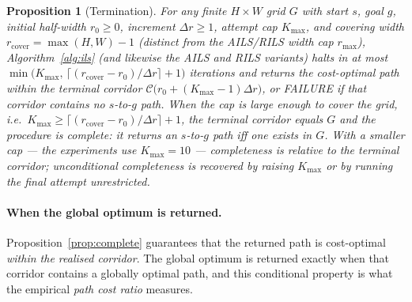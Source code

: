 \documentclass[preprint,12pt,authoryear]{elsarticle}
\newtheorem{proposition}{Proposition}
\begin{document}
\begin{proposition}[Termination]\label{prop:termination}
For any finite $H \times W$ grid $G$ with start $s$, goal $g$, initial half-width $r_0 \geq 0$, increment $\Delta r \geq 1$, attempt cap $K_{\max}$, and covering width $r_{\mathrm{cover}} = \max(H, W) - 1$ (distinct from the AILS/RILS width cap $r_{\max}$), Algorithm~\ref{alg:ils} (and likewise the AILS and RILS variants) halts in at most $\min\!\big(K_{\max},\, \lceil (r_{\mathrm{cover}} - r_0)/\Delta r \rceil + 1\big)$ iterations and returns the cost-optimal path within the terminal corridor $\mathcal{C}\big(r_0 + (K_{\max}-1)\Delta r\big)$, or FAILURE if that corridor contains no $s$-to-$g$ path. When the cap is large enough to cover the grid, i.e.\ $K_{\max} \geq \lceil (r_{\mathrm{cover}} - r_0)/\Delta r \rceil + 1$, the terminal corridor equals $G$ and the procedure is \emph{complete}: it returns an $s$-to-$g$ path iff one exists in $G$. With a smaller cap --- the experiments use $K_{\max} = 10$ --- completeness is relative to the terminal corridor; unconditional completeness is recovered by raising $K_{\max}$ or by running the final attempt unrestricted.
\end{proposition}

\paragraph{When the global optimum is returned.}
Proposition~\ref{prop:complete} guarantees that the returned path is cost-optimal \emph{within the realised corridor}. The global optimum is returned exactly when that corridor contains a globally optimal path, and this conditional property is what the empirical \emph{path cost ratio} measures.
\end{document}

